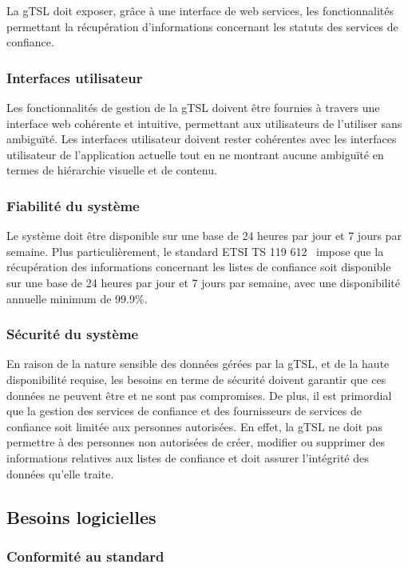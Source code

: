 \documentclass{tnreport}
\begin{document}
La gTSL doit exposer, grâce à une interface de web services, les fonctionnalités permettant la récupération d'informations concernant les statuts des services de confiance.

\subsubsection{Interfaces utilisateur}

Les fonctionnalités de gestion de la gTSL doivent être fournies à travers une interface web cohérente et intuitive, permettant aux utilisateurs de l'utiliser sans ambiguïté. 
Les interfaces utilisateur doivent rester cohérentes avec les interfaces utilisateur de l'application actuelle tout en ne montrant aucune ambiguïté en termes de hiérarchie visuelle et de contenu.

\subsubsection{Fiabilité du système}

Le système doit être disponible sur une base de 24 heures par jour et 7 jours par semaine. Plus
particulièrement, le standard ETSI TS 119 612~\cite{ETSITS119612} impose que la récupération des informations concernant les listes de confiance soit disponible sur une base de 24 heures par jour et 7 jours par semaine, avec une disponibilité annuelle minimum de 99.9\%.

\subsubsection{Sécurité du système}

En raison de la nature sensible des données gérées par la gTSL, et de la haute disponibilité requise, les besoins en terme de sécurité doivent garantir que ces données ne peuvent être et ne sont pas compromises. De plus, il est primordial que la gestion des services de confiance et des fournisseurs de services de confiance soit limitée aux personnes autorisées.
En effet, la gTSL ne doit pas permettre à des personnes non autorisées de créer, modifier ou supprimer des informations relatives aux listes de confiance et doit assurer l'intégrité des données qu'elle traite.

\subsection{Besoins logicielles}

\subsubsection{Conformité au standard}
\end{document}
